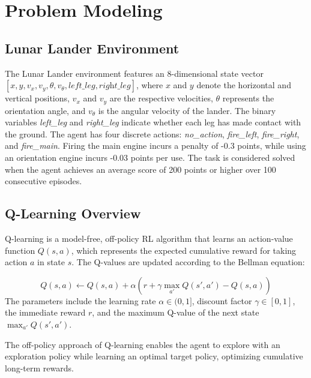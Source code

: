 \documentclass[conference]{IEEEtran}
\begin{document}
\section{Problem Modeling}

\subsection{Lunar Lander Environment}

The Lunar Lander environment features an 8-dimensional state vector \([x, y, v_x, v_y, \theta, v_\theta, \textit{left\_leg}, \textit{right\_leg}]\), where \( x \) and \( y \) denote the horizontal and vertical positions, \( v_x \) and \( v_y \) are the respective velocities, \( \theta \) represents the orientation angle, and \( v_\theta \) is the angular velocity of the lander. The binary variables \textit{left\_leg} and \textit{right\_leg} indicate whether each leg has made contact with the ground. The agent has four discrete actions: \textit{no\_action}, \textit{fire\_left}, \textit{fire\_right}, and \textit{fire\_main}. Firing the main engine incurs a penalty of -0.3 points, while using an orientation engine incurs -0.03 points per use. The task is considered solved when the agent achieves an average score of 200 points or higher over 100 consecutive episodes.



\subsection{Q-Learning Overview}

Q-learning is a model-free, off-policy RL algorithm that learns an action-value function \( Q(s, a) \), which represents the expected cumulative reward for taking action \( a \) in state \( s \). The Q-values are updated according to the Bellman equation:

\begin{equation}
Q(s, a) \leftarrow Q(s, a) + \alpha \left( r + \gamma \max_{a'} Q(s', a') - Q(s, a) \right)
\end{equation}
The parameters include the learning rate \( \alpha \in (0, 1] \), discount factor \( \gamma \in [0, 1] \), the immediate reward \( r \), and the maximum Q-value of the next state \( \max_{a'} Q(s', a') \).


The off-policy approach of Q-learning enables the agent to explore with an exploration policy while learning an optimal target policy, optimizing cumulative long-term rewards.
 
\end{document}
